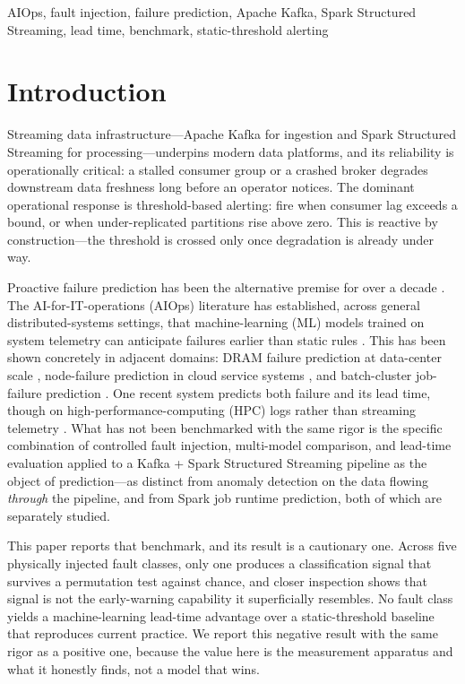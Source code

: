 \documentclass[conference]{IEEEtran}
\begin{document}
\begin{IEEEkeywords}
AIOps, fault injection, failure prediction, Apache Kafka, Spark Structured Streaming, lead time, benchmark, static-threshold alerting
\end{IEEEkeywords}

\section{Introduction}
Streaming data infrastructure---Apache Kafka \cite{kreps2011} for ingestion and Spark Structured Streaming \cite{armbrust2018} for processing---underpins modern data platforms, and its reliability is operationally critical: a stalled consumer group or a crashed broker degrades downstream data freshness long before an operator notices. The dominant operational response is threshold-based alerting: fire when consumer lag exceeds a bound, or when under-replicated partitions rise above zero. This is reactive by construction---the threshold is crossed only once degradation is already under way.

Proactive failure prediction has been the alternative premise for over a decade \cite{salfner2010}. The AI-for-IT-operations (AIOps) literature has established, across general distributed-systems settings, that machine-learning (ML) models trained on system telemetry can anticipate failures earlier than static rules \cite{notaro2021,zhang2024}. This has been shown concretely in adjacent domains: DRAM failure prediction at data-center scale \cite{wu2021}, node-failure prediction in cloud service systems \cite{lin2018}, and batch-cluster job-failure prediction \cite{harrison2018}. One recent system predicts both failure and its lead time, though on high-performance-computing (HPC) logs rather than streaming telemetry \cite{alharthi2023}. What has not been benchmarked with the same rigor is the specific combination of controlled fault injection, multi-model comparison, and lead-time evaluation applied to a Kafka + Spark Structured Streaming pipeline as the object of prediction---as distinct from anomaly detection on the data flowing \emph{through} the pipeline, and from Spark job runtime prediction, both of which are separately studied.

This paper reports that benchmark, and its result is a cautionary one. Across five physically injected fault classes, only one produces a classification signal that survives a permutation test against chance, and closer inspection shows that signal is not the early-warning capability it superficially resembles. No fault class yields a machine-learning lead-time advantage over a static-threshold baseline that reproduces current practice. We report this negative result with the same rigor as a positive one, because the value here is the measurement apparatus and what it honestly finds, not a model that wins.
\end{document}
